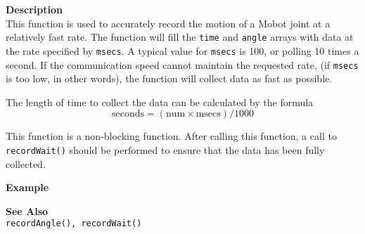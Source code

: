 \noindent
{\bf Description}\\
This function is used to accurately record the motion of a Mobot joint at a relatively fast
rate. The function will fill the \texttt{time} and \texttt{angle} arrays with data
at the rate specified by \texttt{msecs}. A typical value for \texttt{msecs} is 100, or
polling 10 times a second. If the communication speed cannot maintain 
the requested rate, (if \texttt{msecs} is too low, in other words), the function will
collect data as fast as possible. 

The length of time to collect the data can be calculated by the formula \\
\begin{equation*}
\text{seconds} = (\text{num} \times \text{msecs}) / 1000
\end{equation*}

This function is a non-blocking function. After calling this function, a call to
\texttt{recordWait()} should be performed to ensure that the data has been fully collected.

\noindent
{\bf Example}\\
\noindent

\noindent
{\bf See Also}\\
\texttt{recordAngle(), recordWait()}
